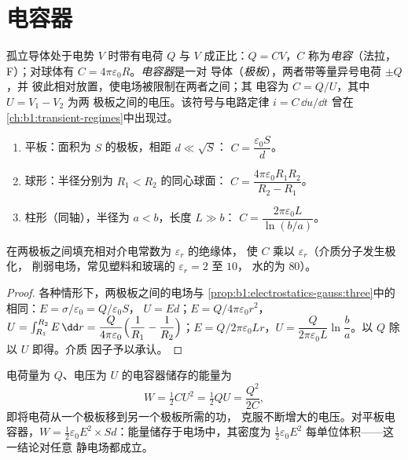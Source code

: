 \section{电容器}

\begin{definition}[电容]\label{def:b1:potential-capacitors:capacitance}
孤立导体处于电势 $V$ 时带有电荷 $Q$
与 $V$ 成正比：$Q = CV$，$C$ 称为\emph{电容}（法拉，
\unit{F}）；对球体有 $C = 4\pi\varepsilon_0R$。\emph{电容器}是一对
导体（\emph{极板}），两者带等量异号电荷 $\pm Q$，并
彼此相对放置，使电场被限制在两者之间；其
电容为 $C = Q/U$，其中 $U = V_1 - V_2$ 为两
极板之间的电压。该符号与电路定律 $i = C\,\dd u/\dd t$ 曾在
\cref{ch:b1:transient-regimes}中出现过。
\end{definition}

\begin{proposition}[三种电容器]\label{prop:b1:potential-capacitors:three}
\begin{enumerate}
  \item 平板：面积为 $S$ 的极板，相距 $d \ll \sqrt S$：
        $C = \dfrac{\varepsilon_0S}{d}$。
  \item 球形：半径分别为 $R_1 < R_2$ 的同心球面：
        $C = \dfrac{4\pi\varepsilon_0R_1R_2}{R_2 - R_1}$。
  \item 柱形（同轴），半径为 $a < b$，长度 $L \gg b$：
        $C = \dfrac{2\pi\varepsilon_0L}{\ln(b/a)}$。
\end{enumerate}
在两极板之间填充相对介电常数为 $\varepsilon_r$ 的绝缘体，
使 $C$ 乘以 $\varepsilon_r$（介质分子发生极化，
削弱电场，常见塑料和玻璃的 $\varepsilon_r = 2$ 至 $10$，
水的为 $80$）。
\end{proposition}

\begin{proof}
各种情形下，两极板之间的电场与
\cref{prop:b1:electrostatics-gauss:three}中的相同：$E = \sigma/\varepsilon_0 = Q/\varepsilon_0S$，
$U = Ed$；$E = Q/4\pi\varepsilon_0r^2$，$U = \int_{R_1}^{R_2}E\,\dd r = \dfrac{Q}{4\pi\varepsilon_0}
\Bigl(\dfrac1{R_1} - \dfrac1{R_2}\Bigr)$；$E = Q/2\pi\varepsilon_0Lr$，$U =
\dfrac{Q}{2\pi\varepsilon_0L}\ln\dfrac ba$。以 $Q$ 除以 $U$ 即得。介质
因子予以承认。
\end{proof}

\begin{theorem}[电容器的能量]\label{thm:b1:potential-capacitors:energy}
电荷量为 $Q$、电压为 $U$ 的电容器储存的能量为
\[
W = \tfrac12 CU^2 = \tfrac12 QU = \frac{Q^2}{2C} ,
\]
即将电荷从一个极板移到另一个极板所需的功，
克服不断增大的电压。对平板电容器，$W = \tfrac12\varepsilon_0E^2
\times Sd$：能量储存于电场中，其密度为 $\tfrac12\varepsilon_0E^2$
每单位体积——这一结论对任意
静电场都成立。
\end{theorem}

